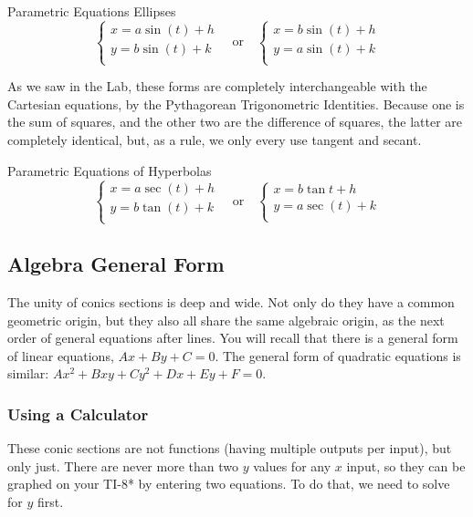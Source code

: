 \begin{derivation}{Parametric Equations Ellipses}
\begin{equation}
	\begin{cases}
	x = a\sin(t) + h \\
	y = b\sin(t) + k\\
	\end{cases}
	\quad \text{or} \quad
	\begin{cases}
	x = b\sin(t) + h \\
	y = a\sin(t) + k\\
	\end{cases}
\end{equation}
\end{derivation}

As we saw in the Lab, these forms are completely interchangeable with the Cartesian equations,
by the Pythagorean Trigonometric Identities.  Because one is the sum of squares, and the other two
are the difference of squares, the latter are completely identical, but, as a rule, we only every use
tangent and secant.

\begin{derivation}{Parametric Equations of Hyperbolas}
\begin{equation}
	\begin{cases}
	x = a\sec(t) + h\\
	y = b\tan(t) + k\\
	\end{cases}
	\quad \text{or} \quad
	\begin{cases}
	x = b\tan{t} + h\\
	y = a\sec(t) + k\\
	\end{cases}
\end{equation}
\end{derivation}

\subsection{Algebra General Form}
The unity of conics sections is deep and wide.  Not only do they have a common geometric
origin, but they also all share the same algebraic origin, as the next order of general equations
after lines.  You will recall that there is a general form of linear equations, $Ax + By + C = 0$.
The general form of quadratic equations is similar: $Ax^2 + Bxy + Cy^2 + Dx + Ey + F=0$.

\subsubsection{Using a Calculator}
These conic sections are not functions (having multiple outputs per input), but only just.
There are never more than two $y$ values for any $x$ input, so they can be graphed on
your TI-8* by entering two equations.  To do that, we need to solve for $y$ first.

